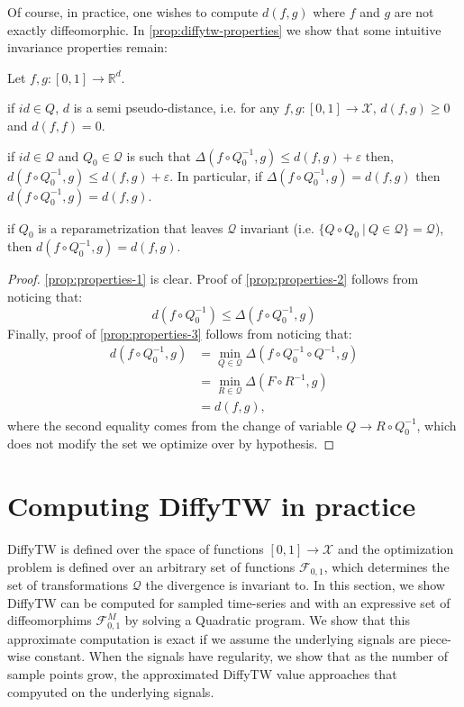 Of course, in practice, one wishes to compute $d(f, g)$ where $f$ and $g$ are not exactly diffeomorphic. In \cref{prop:diffytw-properties} we show that some intuitive invariance properties remain:
\begin{proposition}\label{prop:diffytw-properties} Let $f, g:[0,1] \to\mathbb R^d$.
\begin{enumthm}
\item if $id \in Q$, $d$ is a semi pseudo-distance, i.e. for any $f, g: [0,1] \to\mathcal X$,  $d(f, g)\geq 0$ and $d(f, f)=0$.\label{prop:properties-1}
\item if $id \in \mathcal Q$ and $Q_0\in\mathcal Q$ is such that $\Delta(f\circ Q_0^{-1}, g) \leq d(f, g) + \varepsilon$ then, $d(f \circ Q_0^{-1}, g) \leq d(f, g) + \varepsilon$. In particular, if $\Delta(f\circ Q_0^{-1}, g) = d(f,g)$ then $d(f\circ Q_0^{-1}, g)=d(f, g)$.\label{prop:properties-2}
\item if $Q_0$ is a reparametrization that leaves $\mathcal Q$ invariant (i.e. $\lbrace Q\circ Q_0 ~\vert~ Q\in \mathcal Q \rbrace = \mathcal Q$), then $d(f\circ Q_0^{-1}, g) = d(f, g)$.\label{prop:properties-3}
\end{enumthm}
\end{proposition}
\begin{proof} \cref{prop:properties-1} is clear. Proof of \cref{prop:properties-2} follows from noticing that:
\begin{equation}
d(f\circ Q_0^{-1}) \leq \Delta(f\circ Q_0^{-1}, g)
\end{equation}
Finally, proof of \cref{prop:properties-3} follows from noticing that:
\begin{align}
d(f \circ Q_0^{-1}, g) &= \min_{Q\in\mathcal Q}\Delta(f\circ Q_0^{-1} \circ Q^{-1}, g)\\
& = \min_{R\in\mathcal Q} \Delta(F\circ R^{-1}, g)\\
& = d(f, g),
\end{align} where the second equality comes from the change of variable $Q \to R \circ Q_0^{-1}$, which does not modify the set we optimize over by hypothesis.
\end{proof}

\section{Computing DiffyTW in practice}\label{sec:computing-diffytw}
DiffyTW is defined over the space of functions $[0,1] \to \mathcal X$ and the optimization problem is defined over an arbitrary set of functions $\mathcal F_{0,1}$, which determines the set of transformations $\mathcal Q$ the divergence is invariant to. In this section, we show DiffyTW can be computed for sampled time-series and with an expressive set of diffeomorphims $\mathcal F_{0,1}^M$ by solving a Quadratic program. We show that this approximate computation is exact if we assume the underlying signals are piece-wise constant. When the signals have regularity, we show that as the number of sample points grow, the approximated DiffyTW value approaches that compyuted on the underlying signals.

